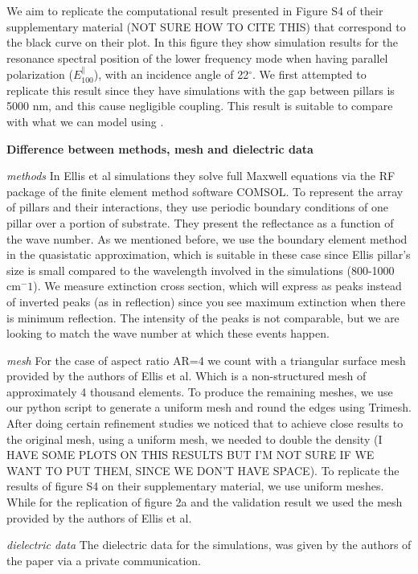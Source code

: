 We aim to replicate the computational result presented in Figure S4 of their supplementary 
material (NOT SURE HOW TO CITE THIS) that correspond to the black curve on their plot. In this 
figure they show simulation results for the resonance spectral position of the lower frequency 
mode when having parallel polarization ($E^{\parallel}_{100}$), with an incidence angle of 22$^\circ$.
We first attempted to replicate this result since they have simulations with the gap between pillars 
is 5000 nm, and this cause negligible coupling. This result is suitable to compare with 
what we can model using \pygbe.  




\textbf{Difference between methods, mesh and dielectric data}

\textit{methods}
In Ellis et al simulations they solve full Maxwell equations via the RF package of the finite
element method software COMSOL. To represent the array of pillars and their interactions, they use
periodic boundary conditions of one pillar over a portion of substrate. They present the reflectance 
as a function of the wave number. As we mentioned before, we use the boundary element method in 
the quasistatic approximation, which is suitable in these case since Ellis pillar's size is small 
compared to the wavelength involved in the simulations (800-1000 cm$^-1$). We measure extinction cross 
section, which will express as peaks instead of inverted peaks (as in reflection) since you see maximum
extinction when there is minimum reflection. The intensity of the peaks is not comparable, but we are 
looking to match the wave number at which these events happen. 

\textit{mesh}
For the case of aspect ratio AR=4 we count with a triangular surface mesh provided by the authors of 
Ellis et al. Which is a non-structured mesh of approximately 4 thousand elements. To produce the remaining 
meshes, we use our python script to generate a uniform mesh and round the edges using Trimesh. 
After doing certain refinement studies we noticed that to achieve close results to the original mesh, using a
uniform mesh, we needed to double the density (I HAVE SOME PLOTS ON THIS RESULTS BUT 
I'M NOT SURE IF WE WANT TO PUT THEM, SINCE WE DON'T HAVE SPACE).
To replicate the results of figure S4 on their supplementary material, we use uniform meshes. While for the 
replication of figure 2a and the validation result we used the mesh provided by the authors of Ellis et al. 


\textit{dielectric data}
The dielectric data for the simulations, was given by the authors of the paper via a private communication. 

